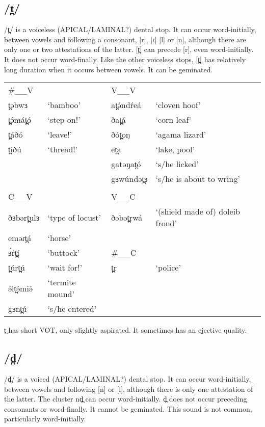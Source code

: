 \subsection{/t̪/}
/t̪/ is a voiceless (APICAL/LAMINAL?) dental stop. It can occur word-initially, between vowels and following a consonant, [r], [ɾ] [l] or [n], although there are only one or two attestations of the latter. [t̪] can precede [r], even word-initially. It does not occur word-finally.
Like the other voiceless stops, [t̪] has relatively long duration when it occurs between vowels. It can be geminated. 

\ea 	
\begin{supertabular}[t]{lllp{4cm}}
\#\_\_V		& & V\_\_V	\\
t̪əbwɜ	&‘bamboo’	&at̪ə́ndŕeá	&‘cloven hoof’\\
t̪ə́mát̪ó	&‘step on!’	&ðat̪á		&‘corn leaf’\\
t̪áðó	&‘leave!’	&ðót̪oŋ		&‘agama lizard’\\
t̪íðú	&‘thread!’	&et̪a		&‘lake, pool’\\
					&&gatəŋat̪ó	&‘s/he licked’\\
					&&gɜwúndət̪ɜ	&‘s/he is about to wring’	\\
&\\
\midrule
C\_\_V		&	&	V\_\_C	\\
\midrule
ðɜbərt̪ulɜ	&‘type of locust’	&ðəbət̪rwá	&‘(shield made of) doleib frond’\\
eməɾt̪á		&‘horse’		\\
ɜ́ŕt̪í		&‘buttock’	&	\#\_\_C	\\
t̪úrt̪ú		&‘wait for!’	&	t̪r		&‘police’\\
ə́lt̪ə́miə́		&‘termite mound’		\\
gɜnt̪ú		&‘s/he entered’	\\
\end{supertabular}\label{ex:ch2:17}
\z 	


t̪ has short VOT, only slightly aspirated. It sometimes has an ejective quality. 

\subsection{/d̪/}
/d̪/ is a voiced (APICAL/LAMINAL?) dental stop. It can occur word-initially, between vowels and following [n] or [l], although there is only one attestation of the latter. The cluster nd̪ can occur word-initially. d̪ does not occur preceding consonants or word-finally. It cannot be geminated. This sound is not common, particularly word-initially.

